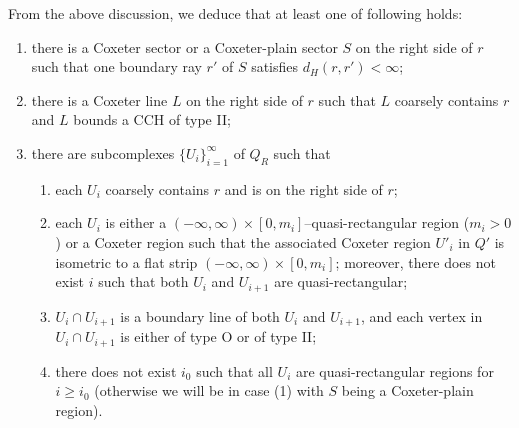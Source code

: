 \documentclass[11pt]{amsart}
\theoremstyle{definition}
\begin{document}
From the above discussion, we deduce that at least one of following holds:
\begin{enumerate}
	\item there is a Coxeter sector or a Coxeter-plain sector $S$ on the right side of $r$ such that one boundary ray $r'$ of $S$ satisfies $d_H(r,r')<\infty$;
	\item there is a Coxeter line $L$ on the right side of $r$ such that $L$ coarsely contains $r$ and $L$ bounds a CCH of type II;
	\item there are subcomplexes $\{U_i\}_{i=1}^{\infty}$ of $Q_R$ such that
	\begin{enumerate}
		\item each $U_i$ coarsely contains $r$ and is on the right side of $r$;
		\item each $U_i$ is either a $(-\infty,\infty)\times [0,m_i]$--quasi-rectangular region ($m_i>0$) or a Coxeter region such that the associated Coxeter region $U'_i$ in $Q'$ is isometric to a flat strip $(-\infty,\infty)\times [0,m_i]$; moreover, there does not exist $i$ such that both $U_i$ and $U_{i+1}$ are quasi-rectangular;
		\item $U_i\cap U_{i+1}$ is a boundary line of both $U_i$ and $U_{i+1}$, and each vertex in $U_i\cap U_{i+1}$ is either of type O or of type II;
		\item there does not exist $i_0$ such that all $U_i$ are quasi-rectangular regions for $i\ge i_0$ (otherwise we will be in case (1) with $S$ being a Coxeter-plain region).
	\end{enumerate}
\end{enumerate}
\end{document}
